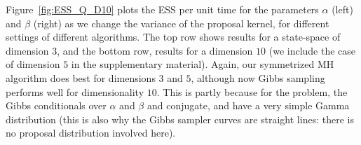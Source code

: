{  %
  Figure~\ref{fig:ESS_Q_D10} plots the ESS 
  per unit time for the parameters $\alpha$ (left) and $\beta$ (right) as we 
  change the variance of the proposal kernel, for different settings of
  different algorithms. The top row shows results for a state-space
  of dimension $3$, and the bottom row, results for a dimension
  $10$ (we include the case of dimension $5$ in the supplementary material).
  Again, our symmetrized  MH algorithm does best for dimensions
  $3$ and $5$, although now Gibbs sampling performs well for dimensionality $10$.
  This is partly because for the problem, the Gibbs conditionals over $\alpha$
  and $\beta$ and conjugate, and have a very simple Gamma distribution
  (this is also why the Gibbs sampler curves are straight lines: there is no
  proposal distribution involved here).
}
